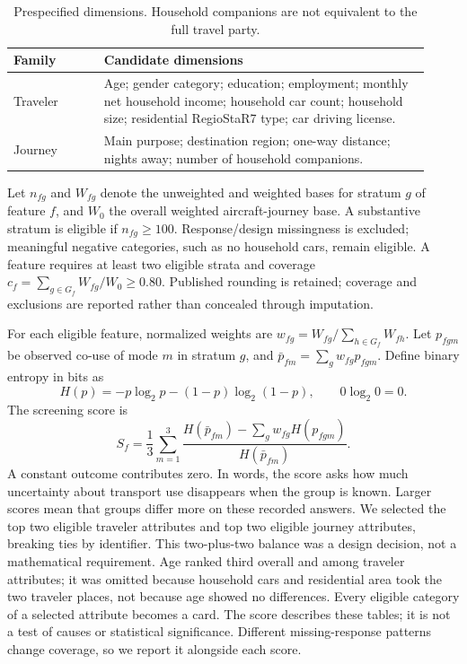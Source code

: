 \documentclass{article}
\begin{document}
\begin{table}[htbp]
\centering\small
\begin{tabular}{p{0.20\linewidth}p{0.72\linewidth}}
\toprule
Family & Candidate dimensions\\
\midrule
Traveler & Age; gender category; education; employment; monthly net household income; household car count; household size; residential RegioStaR7 type; car driving license.\\
Journey & Main purpose; destination region; one-way distance; nights away; number of household companions.\\
\bottomrule
\end{tabular}
\caption{Prespecified dimensions. Household companions are not equivalent to the full travel party.}
\label{tab:candidates}
\end{table}

Let $n_{fg}$ and $W_{fg}$ denote the unweighted and weighted bases for stratum $g$ of feature $f$, and $W_0$ the overall weighted aircraft-journey base. A substantive stratum is eligible if $n_{fg}\geq100$. Response/design missingness is excluded; meaningful negative categories, such as no household cars, remain eligible. A feature requires at least two eligible strata and coverage $c_f=\sum_{g\in G_f}W_{fg}/W_0\geq0.80$. Published rounding is retained; coverage and exclusions are reported rather than concealed through imputation.

For each eligible feature, normalized weights are $w_{fg}=W_{fg}/\sum_{h\in G_f}W_{fh}$. Let $p_{fgm}$ be observed co-use of mode $m$ in stratum $g$, and $\bar p_{fm}=\sum_gw_{fg}p_{fgm}$. Define binary entropy in bits as
\begin{equation}
H(p)=-p\log_2p-(1-p)\log_2(1-p),\qquad 0\log_2 0=0.
\end{equation}
The screening score is
\begin{equation}
S_f=\frac{1}{3}\sum_{m=1}^{3}\frac{H(\bar p_{fm})-\sum_gw_{fg}H(p_{fgm})}{H(\bar p_{fm})}.
\end{equation}
A constant outcome contributes zero. In words, the score asks how much uncertainty about transport use disappears when the group is known. Larger scores mean that groups differ more on these recorded answers. We selected the top two eligible traveler attributes and top two eligible journey attributes, breaking ties by identifier. This two-plus-two balance was a design decision, not a mathematical requirement. Age ranked third overall and among traveler attributes; it was omitted because household cars and residential area took the two traveler places, not because age showed no differences. Every eligible category of a selected attribute becomes a card. The score describes these tables; it is not a test of causes or statistical significance. Different missing-response patterns change coverage, so we report it alongside each score.
\end{document}
